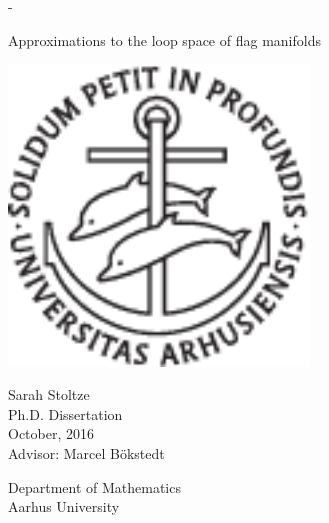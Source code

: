 \begin{titlingpage}
  \calccentering{\unitlength}
  \begin{adjustwidth*}{\unitlength}{-\unitlength}
    \begin{adjustwidth}{-1cm}{-1cm}
      \vspace*{1cm}
      \centering
      \scshape

      {\Huge
        \begin{center}
          Approximations to the loop
          space of flag manifolds
        \end{center}
        }

      \vspace*{4.5\onelineskip}

      \includegraphics[width=8cm]{billeder/segla1s.pdf}

      \vspace*{4.5\onelineskip}

      {\Large
        \linespread{1.4}\selectfont
        {\huge Sarah Stoltze}\\
        \vspace{1em}
        Ph.D. Dissertation\\
        October, 2016 %
        \\
        \vspace{1em}
        Advisor: Marcel B\"okstedt}

      \strut\vfill
      Department of Mathematics\\
      Aarhus University
    \end{adjustwidth}
  \end{adjustwidth*}

\end{titlingpage}


